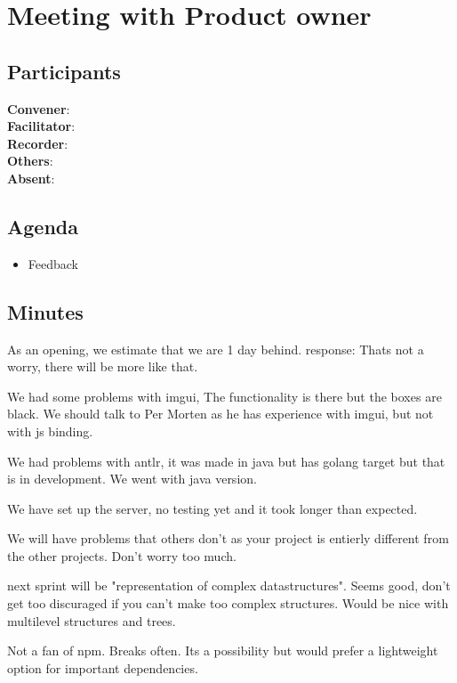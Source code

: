 \section*{Meeting with Product owner}

\subsection*{Participants}
\textbf{Convener}: \productowner{}\\
\textbf{Facilitator}: \facilitator{}  \\
\textbf{Recorder}: \scrummaster{}  \\
\textbf{Others}: \groupleader{} \\
\textbf{Absent}: 

\subsection*{Agenda}
\begin{itemize}
    \item Feedback
\end{itemize}

\subsection*{Minutes}
As an opening, we estimate that we are 1 day behind.
response: Thats not a worry, there will be more like that. 

We had some problems with imgui, The functionality is there but the boxes are black. 
We should talk to Per Morten as he has experience with imgui, but not with js binding.

We had problems with antlr, it was made in java but has golang target but that is in development. We went with java version. 

We have set up the server, no testing yet and it took longer than expected. 

We will have problems that others don't as your project is entierly different from the other projects. Don't worry too much. 

next sprint will be "representation of complex datastructures". Seems good, don't get too discuraged if you can't make too complex structures. Would be nice with multilevel structures and trees. 


Not a fan of npm. Breaks often. Its a possibility but would prefer a lightweight option for important dependencies. 

\newpage